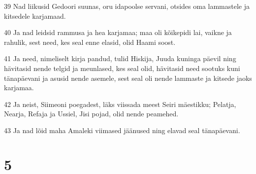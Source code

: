 \par 39 Nad liikusid Gedoori suunas, oru idapoolse servani, otsides oma lammastele ja kitsedele karjamaad.
\par 40 Ja nad leidsid rammusa ja hea karjamaa; maa oli kõikepidi lai, vaikne ja rahulik, sest need, kes seal enne elasid, olid Haami soost.
\par 41 Ja need, nimeliselt kirja pandud, tulid Hiskija, Juuda kuninga päevil ning hävitasid nende telgid ja meunlased, kes seal olid, hävitasid need sootuks kuni tänapäevani ja asusid nende asemele, sest seal oli nende lammaste ja kitsede jaoks karjamaa.
\par 42 Ja neist, Siimeoni poegadest, läks viissada meest Seiri mäestikku; Pelatja, Nearja, Refaja ja Ussiel, Jisi pojad, olid nende peamehed.
\par 43 Ja nad lõid maha Amaleki viimased jäänused ning elavad seal tänapäevani.

\chapter{5}

